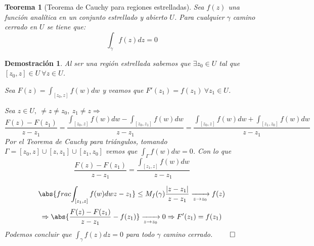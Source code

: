 \documentclass[12pt]{book}
\newtheorem{theorem}{Teorema}[chapter]
\newtheorem*{dem}{Demostración}
\begin{document}
\begin{theorem}[Teorema de Cauchy para regiones estrelladas]
Sea $f(z)$ una función analítica en un conjunto estrellado y abierto $U$. Para cualquier $\gamma$ camino cerrado en $U$ se tiene que:
$$
\int_{\gamma} f(z)dz = 0
$$
\end{theorem}

\begin{dem}
Al ser una región estrellada sabemos que $\exists z_0\in U$ tal que $[z_0,z]\in U\ \forall z \in U$.

Sea $F(z) = \int_{[z_0,z]}f(w)dw$ y veamos que $F'(z_1) = f(z_1)\ \forall z_1 \in U$.

Sea $z \in U,\ \neq z \neq z_0,\ z_1 \neq z \Rightarrow$
$$
\frac{F(z)-F(z_1)}{z-z_1} = \frac{\int_{[z_0,z]}f(w)dw- \int_{[z_0,z_1]}f(w)dw}{z-z_1} = \frac{\int_{[z_0,z]}f(w)dw+ \int_{[z_1,z_0]}f(w)dw}{z-z_1}
$$
Por el Teorema de Cauchy para triángulos, tomando $\Gamma = [z_0,z]\cup [z,z_1]\cup[z_1,z_0]$ vemos que $\int_\Gamma f(w)dw = 0$. Con lo que 
$$\frac{F(z)-F(z_1)}{z-z_1} = \frac{\int_{[z_1,z]}f(w)dw}{z-z_1}$$

$$
\abs{ frac{\int_{[z_1,z]}f(w)dw}{z-z_1}}\leq M_f(\gamma) \frac{|z-z_1|}{z-z_1} \xrightarrow[z\to z_0]{} f(z)
$$
$$
\Rightarrow \abs{\frac{F(z)-F(z_1)}{z-z_1}-f(z_1)}\xrightarrow[z\to z_0]{} 0 \Rightarrow F'(z_1) = f(z_1)
$$
Podemos concluir que $\int_\gamma f(z)dz=0$ para todo $\gamma$ camino cerrado. $\qed$
\end{dem}
\end{document}

